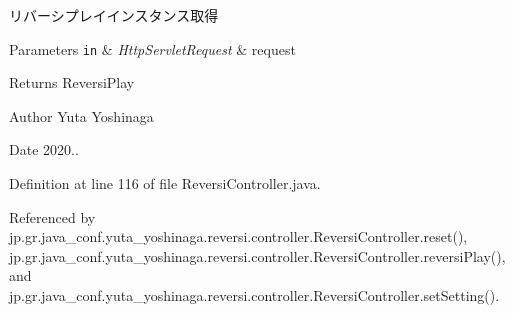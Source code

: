 リバーシプレイインスタンス取得 


\begin{DoxyParams}[1]{Parameters}
\mbox{\tt in}  & {\em Http\+Servlet\+Request} & request \\
\hline
\end{DoxyParams}
\begin{DoxyReturn}{Returns}
Reversi\+Play 
\end{DoxyReturn}
\begin{DoxyAuthor}{Author}
Yuta Yoshinaga 
\end{DoxyAuthor}
\begin{DoxyDate}{Date}
2020.. 
\end{DoxyDate}


Definition at line 116 of file Reversi\+Controller.\+java.



Referenced by jp.\+gr.\+java\+\_\+conf.\+yuta\+\_\+yoshinaga.\+reversi.\+controller.\+Reversi\+Controller.\+reset(), jp.\+gr.\+java\+\_\+conf.\+yuta\+\_\+yoshinaga.\+reversi.\+controller.\+Reversi\+Controller.\+reversi\+Play(), and jp.\+gr.\+java\+\_\+conf.\+yuta\+\_\+yoshinaga.\+reversi.\+controller.\+Reversi\+Controller.\+set\+Setting().

